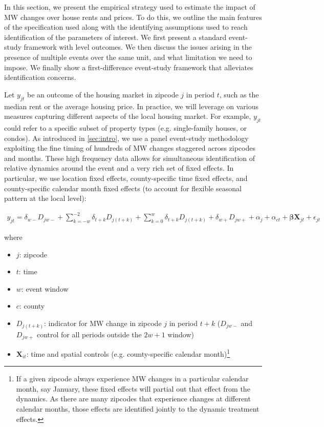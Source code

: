 In this section, we present the empirical strategy used to estimate the impact of MW changes over house rents and prices. To do this, we outline the main features of the specification used along with the identifying assumptions used to reach identification of the parameters of interest. We first present a standard event-study framework with level outcomes. We then discuss the issues arising in the presence of multiple events over the same unit, and what limitation we need to impose. We finally show a first-difference event-study framework that alleviates identification concerns.  

Let $y_{jt}$ be an outcome of the housing market in zipcode $j$ in period $t$, such as the median rent or the average housing price. In practice, we will leverage on various measures capturing different aspects of the local housing market. For example, $y_{jt}$ could refer to a specific subset of property types (e.g. single-family houses, or condos). As introduced in \autoref{sec:intro}, we use a panel event-study methodology exploiting the fine timing of hundreds of MW changes staggered across zipcodes and months. These high frequency data allows for simultaneous identification of relative dynamics around the event and a very rich set of fixed effects. In particular, we use location fixed effects, county-specific time fixed effects, and county-specific calendar month fixed effects (to account for flexible seasonal pattern at the local level):

\begin{equation}\label{eq:main_ziplevel}
\begin{aligned}
    y_{jt} = \delta_{w-}D_{jw-} + \sum\limits_{k = -w}^{-2}\delta_{t + k} D_{j(t+k)} + \sum\limits_{k = 0}^{w}\delta_{t + k} D_{j(t + k)}  + \delta_{w+}D_{jw+} + \alpha_{j} + \alpha_{ct} + \boldsymbol{\beta} \boldsymbol{X}_{jt} +\epsilon_{jt} 
\end{aligned}   
\end{equation}

where

\begin{itemize}
    \item $j$: zipcode
    \item $t$: time
    \item $w$: event window
    \item $c$: county
    \item $D_{j (t + k)}$: indicator for MW change in zipcode $j$ in period $t+k$ ($D_{jw-}$ and $D_{jw+}$ control for all periods outside the $2w + 1$ window)
    \item $\boldsymbol{X}_{it}$: time and spatial controls (e.g. county-specific calendar month)\footnote{If a given zipcode always experience MW changes in a particular calendar month, say January, these fixed effects will partial out that effect from the dynamics. As there are many zipcodes that experience changes at different calendar months, those effects are identified jointly to the dynamic treatment effects.}
\end{itemize}

